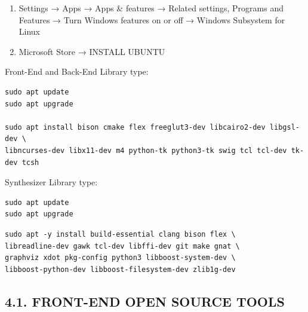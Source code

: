 \documentclass[
]{article}
\begin{document}
\begin{enumerate}
\def\labelenumi{\arabic{enumi}.}
\item
  Settings → Apps → Apps \& features → Related settings, Programs and
  Features → Turn Windows features on or off → Windows Subsystem for
  Linux
\item
  Microsoft Store → INSTALL UBUNTU
\end{enumerate}

Front-End and Back-End Library type:

\begin{verbatim}
sudo apt update
sudo apt upgrade

sudo apt install bison cmake flex freeglut3-dev libcairo2-dev libgsl-dev \
libncurses-dev libx11-dev m4 python-tk python3-tk swig tcl tcl-dev tk-dev tcsh
\end{verbatim}

Synthesizer Library type:

\begin{verbatim}
sudo apt update
sudo apt upgrade
\end{verbatim}

\begin{verbatim}
sudo apt -y install build-essential clang bison flex \
libreadline-dev gawk tcl-dev libffi-dev git make gnat \
graphviz xdot pkg-config python3 libboost-system-dev \
libboost-python-dev libboost-filesystem-dev zlib1g-dev
\end{verbatim}

\hypertarget{front-end-open-source-tools}{%
\subsection{4.1. FRONT-END OPEN SOURCE
TOOLS}\label{front-end-open-source-tools}}
\end{document}
